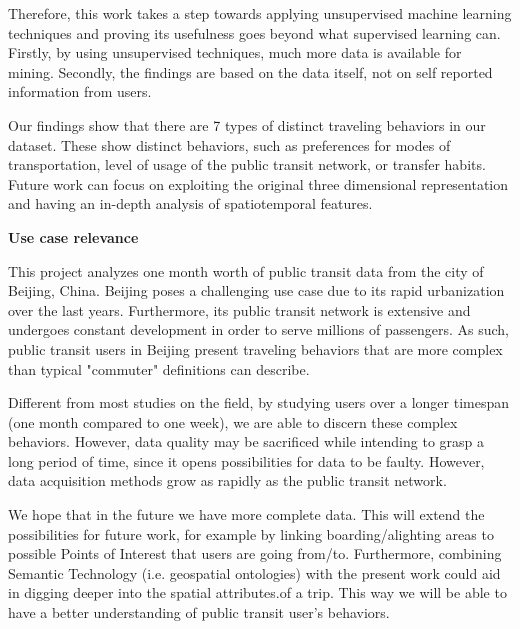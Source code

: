 \documentclass{article}
\begin{document}
Therefore, this work takes a step towards applying unsupervised machine learning techniques and proving its usefulness goes beyond what supervised learning can. Firstly, by using unsupervised techniques, much more data is available for mining. Secondly, the findings are based on the data itself, not on self reported information from users. 

Our findings show that there are 7 types of distinct traveling behaviors in our dataset. These show distinct behaviors, such as preferences for modes of transportation, level of usage of the public transit network, or transfer habits. Future work can focus on exploiting the original three dimensional representation and having an in-depth analysis of spatiotemporal features.  
 
\textbf{Use case relevance}

This project analyzes one month worth of public transit data from the city of Beijing, China. Beijing poses a challenging use case due to its rapid urbanization over the last years. Furthermore, its public transit network is extensive and undergoes constant development in order to serve millions of passengers. As such, public transit users in Beijing present traveling behaviors that are more complex than typical "commuter" definitions can describe. 

Different from most studies on the field, by studying users over a longer timespan (one month compared to one week), we are able to discern these complex behaviors. However, data quality may be sacrificed while intending to grasp a long period of time, since it opens possibilities for data to be faulty. However, data acquisition methods grow as rapidly as the public transit network. 

We hope that in the future we have more complete data. This will extend the possibilities for future work, for example by linking boarding/alighting areas to possible Points of Interest that users are going from/to. Furthermore, combining Semantic Technology (i.e. geospatial ontologies) with the present work could aid in digging deeper into the spatial attributes.of a trip. This way we will be able to have a better understanding of public transit user's behaviors. 


\newpage
{}

\end{document}
